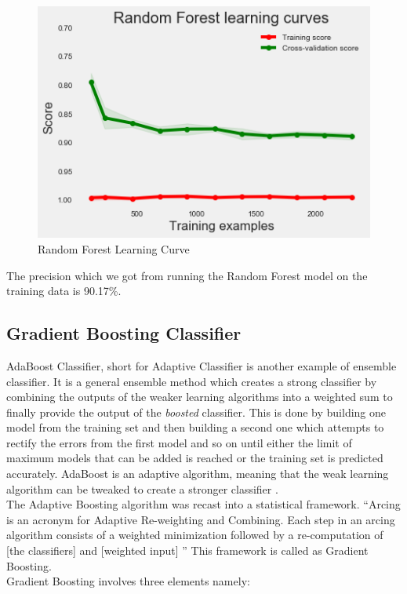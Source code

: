 \begin{figure}
\caption{Random Forest Learning Curve}
\label{5.3}
\centering
\includegraphics[width=\columnwidth]{images/5_3.png}
\end{figure}

The precision which we got from running the Random Forest model on the training data is 90.17\%.


\subsection{Gradient Boosting Classifier}
AdaBoost Classifier, short for Adaptive Classifier is another example of ensemble classifier. 
It is a general ensemble method which creates a strong classifier by combining the outputs of the weaker learning algorithms into a weighted sum to finally provide the output of the \emph{boosted} classifier. This is done by building one model from the training set and then building a second one which attempts to rectify the errors from the first model and so on until either the limit of maximum models that can be added is reached or the training set is predicted accurately. AdaBoost is an adaptive algorithm, meaning that the weak learning algorithm can be tweaked to create a stronger classifier \cite{link15}. \\
The Adaptive Boosting algorithm was recast into a statistical framework. ``Arcing is an acronym for Adaptive Re-weighting and Combining. Each step in an arcing algorithm consists of a weighted minimization followed by a re-computation of [the classifiers] and [weighted input] \cite{link15}''
This framework is called as Gradient Boosting. \\
Gradient Boosting involves three elements namely:

